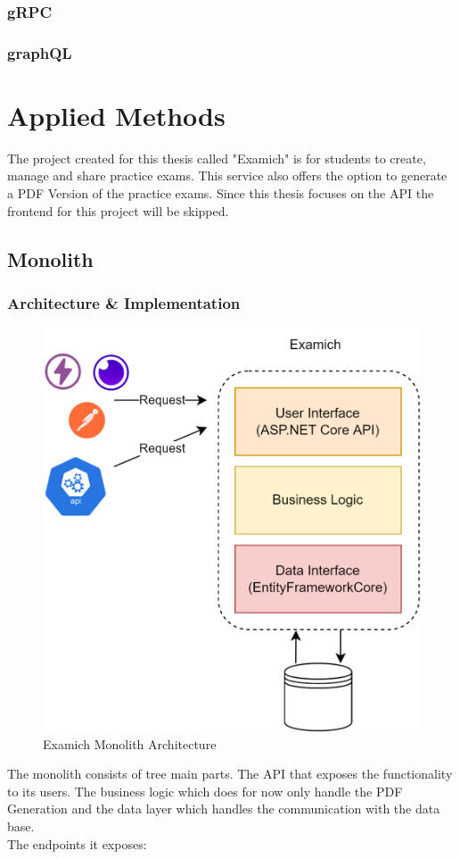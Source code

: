 \documentclass[BIF,Master,nenglish]{twbook}%
\begin{document}
\subsection{gRPC}
\subsection{graphQL}

\clearpage
\chapter{Applied Methods}
The project created for this thesis called "Examich" is for students to create, manage and share practice exams. This service also offers the option to generate a PDF Version of the practice exams. Since this thesis focuses on the API the frontend for this project will be skipped.

\section{Monolith}

\subsection{Architecture \& Implementation}

\begin{figure} [H]
 \begin{center}
    \includegraphics[width=0.6\linewidth]{img/ExamichMonolith.png}
 \end{center}
 \caption{Examich Monolith Architecture}
 \label{examichMonolith}
\end{figure}

The monolith consists of tree main parts. The API that exposes the functionality to its users. The business logic which does for now only handle the PDF Generation and the data layer which handles the communication with the data base.
\\
\noindent
The endpoints it exposes:
\end{document}
